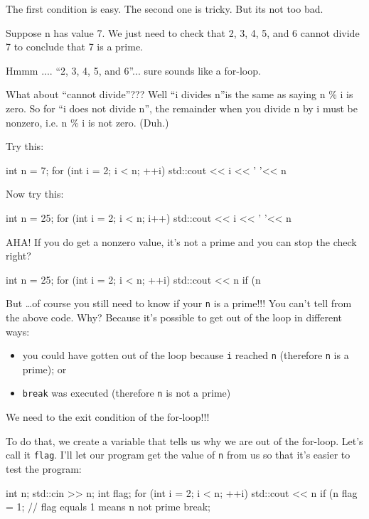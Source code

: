\begin{console}
\begin{console}
The first condition is easy. The second one is tricky. But its not too
bad.

Suppose n has value 7. We just need to check that 2, 3, 4, 5, and 6
cannot divide 7 to conclude that 7 is a prime.

Hmmm .... ``2, 3, 4, 5, and 6''... sure sounds like a for-loop.

What about ``cannot divide''??? Well ``i divides n''is the same as
saying n \% i is zero. So for ``i does not divide n'', the remainder
when you divide n by i must be nonzero, i.e. n \% i is not zero. (Duh.)

Try this:
\begin{console}
int n = 7;
for (int i = 2; i < n; ++i)
{   
    std::cout << i << ' '<< n %
}
\end{console}
Now try this:
\begin{console}
int n = 25;
for (int i = 2; i < n; i++)
{   
    std::cout << i << ' '<< n %
}
\end{console}
AHA! If you do get a nonzero value, it's not a prime and
you can stop the check right?
\begin{console}
int n = 25;
for (int i = 2; i < n; ++i)
{   
    std::cout << n %
    if (n %
}
\end{console}
But \ldots of course you still need to know if your \texttt{n} is a
prime!!! You can't tell from the above code. Why?
Because it's possible to get out of the loop in
 different ways:

\begin{itemize}
\item
  you could have gotten out of the loop because \texttt{i} reached
  \texttt{n} (therefore \texttt{n} is a prime); or
\item
  \texttt{break} was executed (therefore \texttt{n} is not a prime)
\end{itemize}

We need to  the exit condition of the for-loop!!!

To do that, we create a variable that tells us why we are out of the
for-loop. Let's call it \texttt{flag}.
I'll let our program get the value of \texttt{n} from us
so that it's easier to test the program:
\begin{console}
int n;
std::cin >> n;
int flag;
for (int i = 2; i < n; ++i)
{   
    std::cout << n %
    if (n %
    {
        flag = 1; // flag equals 1 means n not prime
        break;
    }
}
\end{console}


\end{console}
\end{console}
